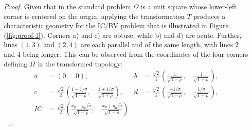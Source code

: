 \documentclass[10pt]{article}
\begin{document}
\begin{proof}
  Given that in the standard problem $\Omega$ is a unit square
  whose lower-left corner is centered on the origin, applying the
  transformation $T$ produces a characteristic geometry for the IC/BV
  problem that is illustrated in Figure (\ref{fig:proof-1}). Corners
  a) and c) are obtuse, while b) and d) are acute. Further, lines
  $(1,3)$ and $(2, 4)$ are each parallel and of the same length, with
  lines 2 and 4 being longer. This can be observed from the
  coordinates of the four corners defining $\Omega$ in the transformed
  topology:
  \begin{align*}
    a &= (0,\quad 0),&
                       b &= \frac{\sqrt{2}}{2} \left( \frac{1}{\sqrt{1-\rho}},\quad \frac{1}{\sqrt{1+\rho}} \right), \\
    c &= \frac{\sqrt{2}}{2} \left( \frac{1-1/\tilde{\sigma}}{\sqrt{1-\rho}},\quad \frac{1+1/\tilde{\sigma}}{\sqrt{1+\rho}} \right),&
                                                                                                                                     d &= \frac{\sqrt{2}}{2} \left( \frac{-1/\tilde{\sigma}}{\sqrt{1-\rho}},\quad \frac{1/\tilde{\sigma}}{\sqrt{1+\rho}} \right), \\
    IC &= \frac{\sqrt{2}}{2} \left( \frac{x_0 - y_0/\tilde{\sigma}}{\sqrt{1-\rho}},\quad \frac{x_0 + y_0/\tilde{\sigma}}{\sqrt{1-\rho}} \right)
  \end{align*}


\end{proof}
\end{document}

